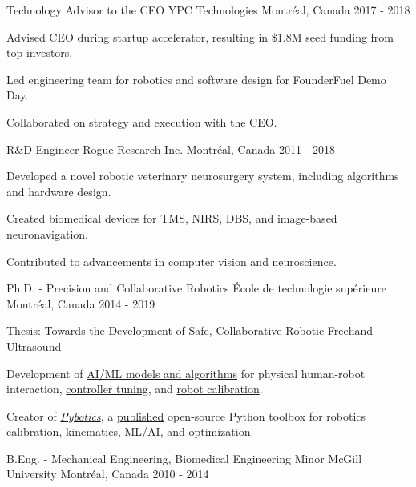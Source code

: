 \documentclass[11pt, letterpaper]{awesome-cv}
\begin{document}
\begin{cventries}
    \cventry
    {Technology Advisor to the CEO}
    {YPC Technologies}
    {Montréal, Canada}
    {2017 - 2018}
    {
        \begin{cvitems}
            \item{Advised CEO during startup accelerator, resulting in \$1.8M seed funding from top investors.}
            \item{Led engineering team for robotics and software design for FounderFuel Demo Day.}
            \item{Collaborated on strategy and execution with the CEO.}
        \end{cvitems}
    }

    \cventry
    {R\&D Engineer}
    {Rogue Research Inc.}
    {Montréal, Canada}
    {2011 - 2018}
    {
        \begin{cvitems}
            \item{Developed a novel robotic veterinary neurosurgery system, including algorithms and hardware design.}
            \item{Created biomedical devices for TMS, NIRS, DBS, and image-based neuronavigation.}
            \item{Contributed to advancements in computer vision and neuroscience.}
        \end{cvitems}
    }

\end{cventries}

\begin{cventries}

    \cventry
    {Ph.D. - Precision and Collaborative Robotics}
    {École de technologie supérieure}
    {Montréal, Canada}
    {2014 - 2019}
    {
        \begin{cvitems}
            \item{Thesis: \href{https://www.nicholasnadeau.com/publication/nadeau-2019-towards/}{Towards the Development of Safe, Collaborative Robotic Freehand Ultrasound}}
            \item{Development of \href{https://www.nicholasnadeau.com/talk/hardware-in-the-loop-training-robot-contact-in-an-unstructured-environment/}{AI/ML models and algorithms} for physical human-robot interaction, \href{https://www.nicholasnadeau.com/publication/nadeau-2018-evolutionary/}{controller tuning}, and \href{https://www.nicholasnadeau.com/publication/nadeau-2019-impedance/}{robot calibration}.}
            \item{Creator of \href{https://github.com/EngNadeau/pybotics}{\textit{Pybotics}}, a \href{https://joss.theoj.org/papers/10.21105/joss.01738}{published} open-source Python toolbox for robotics calibration, kinematics, ML/AI, and optimization.}
        \end{cvitems}
    }

    \cventry
    {B.Eng. - Mechanical Engineering, Biomedical Engineering Minor}
    {McGill University}
    {Montréal, Canada}
    {2010 - 2014}
    {
        \begin{cvitems}
        \end{cvitems}
    }

\end{cventries}
\end{document}
